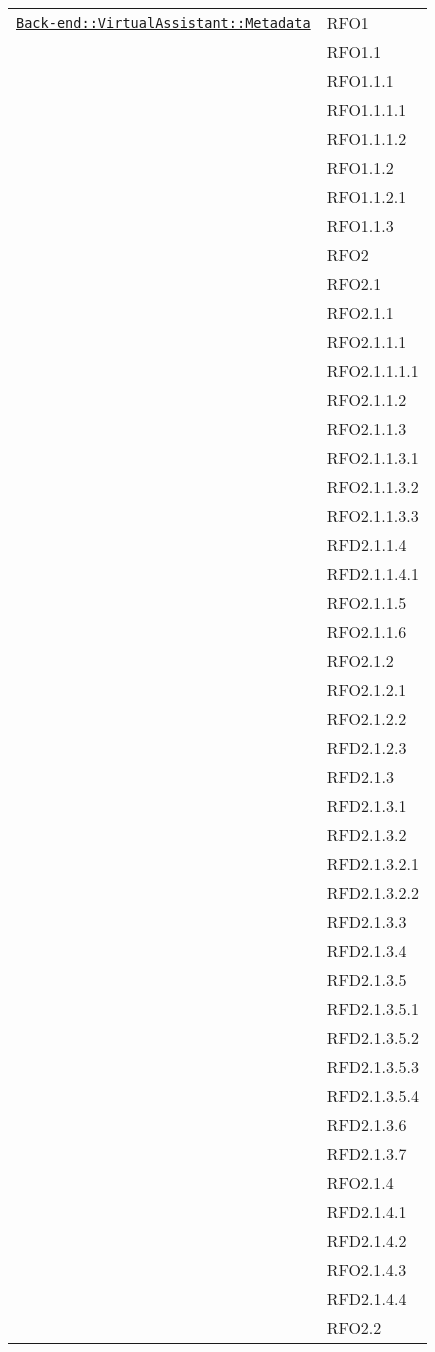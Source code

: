 \begin{longtable}{|>{\centering}m{10cm}|m{3cm}<{\centering}|}
\hyperref[Back-end::VirtualAssistant::Metadata]{\texttt{Back-end::VirtualAssistant::Metadata}} & RFO1\\
& RFO1.1\\
& RFO1.1.1\\
& RFO1.1.1.1\\
& RFO1.1.1.2\\
& RFO1.1.2\\
& RFO1.1.2.1\\
& RFO1.1.3\\
& RFO2\\
& RFO2.1\\
& RFO2.1.1\\
& RFO2.1.1.1\\
& RFO2.1.1.1.1\\
& RFO2.1.1.2\\
& RFO2.1.1.3\\
& RFO2.1.1.3.1\\
& RFO2.1.1.3.2\\
& RFO2.1.1.3.3\\
& RFD2.1.1.4\\
& RFD2.1.1.4.1\\
& RFO2.1.1.5\\
& RFO2.1.1.6\\
& RFO2.1.2\\
& RFO2.1.2.1\\
& RFO2.1.2.2\\
& RFD2.1.2.3\\
& RFD2.1.3\\
& RFD2.1.3.1\\
& RFD2.1.3.2\\
& RFD2.1.3.2.1\\
& RFD2.1.3.2.2\\
& RFD2.1.3.3\\
& RFD2.1.3.4\\
& RFD2.1.3.5\\
& RFD2.1.3.5.1\\
& RFD2.1.3.5.2\\
& RFD2.1.3.5.3\\
& RFD2.1.3.5.4\\
& RFD2.1.3.6\\
& RFD2.1.3.7\\
& RFO2.1.4\\
& RFD2.1.4.1\\
& RFD2.1.4.2\\
& RFO2.1.4.3\\
& RFD2.1.4.4\\
& RFO2.2\\

\end{longtable}
